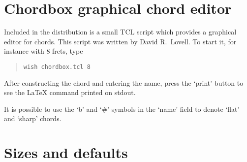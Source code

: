 \documentclass{article}
\begin{document}
\section{Chordbox graphical chord editor}

Included in the distribution is a small TCL script which provides a 
graphical editor for chords. This script was written by David R.~Lovell.
To start it, for instance with 8 frets, type
\begin{quote}
\verb|wish chordbox.tcl 8|
\end{quote}
After constructing the chord and entering the name, press the `print' button 
to see the \LaTeX{} command printed on stdout. 

It is possible to use the `b' and `\#' symbols in the `name' field to 
denote `flat' and `sharp' chords.

\section{Sizes and defaults}
\end{document}
